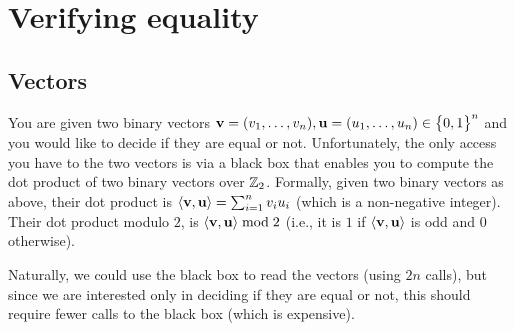 %




\ChapterPrefix{}
\ChapterGen{}




\section{Verifying equality}

\subsection{Vectors}

You are given two binary vectors
$\mathbf{v} = (v_1, \ldots, v_n), \mathbf{u} = (u_1, \ldots, u_n) \in
\left\{ {\bigl. 0,1} \right\}^n$ and you would like to decide if they are equal or
not. Unfortunately, the only access you have to the two vectors is via
a black box that enables you to compute the dot product of two binary
vectors over $\mathbb{Z}_2$. Formally, given two binary vectors as above,
their dot product is $\left\langle {{\mathbf{v}},{\mathbf{u}}} \right\rangle = \sum_{i=1}^n v_i u_i$
(which is a non-negative integer). Their dot product modulo
$2$, is \;$\left\langle {{\mathbf{v}},{\mathbf{u}}} \right\rangle \bmod 2$\; (i.e., it is $1$ if
$\left\langle {{\mathbf{v}},{\mathbf{u}}} \right\rangle$ is odd and $0$ otherwise).

Naturally, we could use the black box to read the vectors (using
$2n$ calls), but since we are interested only in deciding if they are
equal or not, this should require fewer calls to the black box (which
is expensive).


